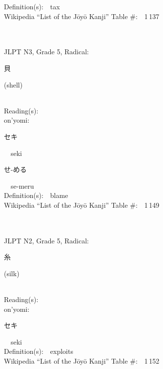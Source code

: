 \begin{multicols}{2}
Definition(s):\ \ tax \\
Wikipedia ``List of the J\=oy\=o Kanji'' Table \#:\ \ 1\,137 \\
\ \ \\
{\fontsize{34pt}{40pt}  }\ \ \\  %
{JLPT N3, Grade 5, Radical:\ \ {\begin{CJK}{UTF8}{min} 貝 \end{CJK}} (shell) } \\
Reading(s):\ \ \\
{\hspace*{1em}}on'yomi:\ \ \\
{\hspace*{2em}}{\begin{CJK}{UTF8}{min} セキ \end{CJK}}\ \ seki\ \ \\
{\hspace*{2em}}{\begin{CJK}{UTF8}{min} せ-める \end{CJK}}\ \ se-meru\ \ \\
Definition(s):\ \ blame \\
Wikipedia ``List of the J\=oy\=o Kanji'' Table \#:\ \ 1\,149 \\
\ \ \\
{\fontsize{34pt}{40pt}  }\ \ \\  %
{JLPT N2, Grade 5, Radical:\ \ {\begin{CJK}{UTF8}{min} 糸 \end{CJK}} (silk) } \\
Reading(s):\ \ \\
{\hspace*{1em}}on'yomi:\ \ \\
{\hspace*{2em}}{\begin{CJK}{UTF8}{min} セキ \end{CJK}}\ \ seki\ \ \\
Definition(s):\ \ exploits \\
Wikipedia ``List of the J\=oy\=o Kanji'' Table \#:\ \ 1\,152 \\
\ \ \\

\end{multicols}
